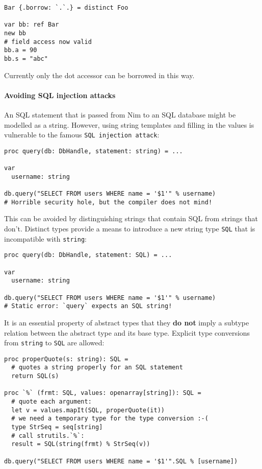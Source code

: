 \begin{verbatim}
Bar {.borrow: `.`.} = distinct Foo

var bb: ref Bar
new bb
# field access now valid
bb.a = 90
bb.s = "abc"
\end{verbatim}

Currently only the dot accessor can be borrowed in this way.

\hypertarget{avoiding-sql-injection-attacks}{%
\paragraph{Avoiding SQL injection
attacks}\label{avoiding-sql-injection-attacks}}

An SQL statement that is passed from Nim to an SQL database might be
modelled as a string. However, using string templates and filling in the
values is vulnerable to the famous \texttt{SQL\ injection\ attack}:

\begin{verbatim}
proc query(db: DbHandle, statement: string) = ...

var
  username: string

db.query("SELECT FROM users WHERE name = '$1'" % username)
# Horrible security hole, but the compiler does not mind!
\end{verbatim}

This can be avoided by distinguishing strings that contain SQL from
strings that don't. Distinct types provide a means to introduce a new
string type \texttt{SQL} that is incompatible with \texttt{string}:

\begin{verbatim}
proc query(db: DbHandle, statement: SQL) = ...

var
  username: string

db.query("SELECT FROM users WHERE name = '$1'" % username)
# Static error: `query` expects an SQL string!
\end{verbatim}

It is an essential property of abstract types that they \textbf{do not}
imply a subtype relation between the abstract type and its base type.
Explicit type conversions from \texttt{string} to \texttt{SQL} are
allowed:

\begin{verbatim}
proc properQuote(s: string): SQL =
  # quotes a string properly for an SQL statement
  return SQL(s)

proc `%` (frmt: SQL, values: openarray[string]): SQL =
  # quote each argument:
  let v = values.mapIt(SQL, properQuote(it))
  # we need a temporary type for the type conversion :-(
  type StrSeq = seq[string]
  # call strutils.`%`:
  result = SQL(string(frmt) % StrSeq(v))

db.query("SELECT FROM users WHERE name = '$1'".SQL % [username])
\end{verbatim}

